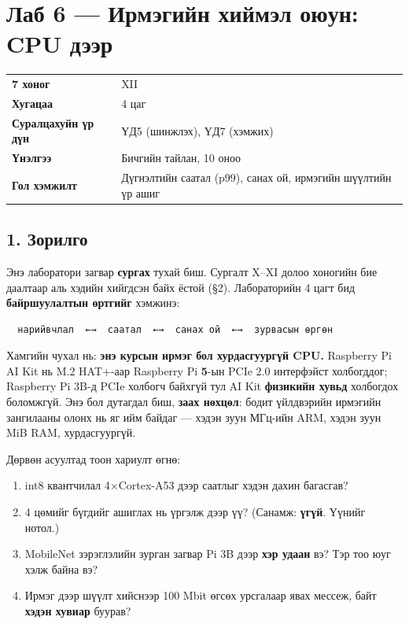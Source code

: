 \chapter{Лаб 6 — Ирмэгийн хиймэл оюун: CPU дээр}

\begingroup\scriptsize\begin{longtable}[]{@{}ll@{}}
\toprule
\endhead
\textbf{7 хоног} & XII\tabularnewline
\textbf{Хугацаа} & 4 цаг\tabularnewline
\textbf{Суралцахуйн үр дүн} & ҮД5 (шинжлэх), ҮД7 (хэмжих)\tabularnewline
\textbf{Үнэлгээ} & Бичгийн тайлан, 10 оноо\tabularnewline
\textbf{Гол хэмжилт} & Дүгнэлтийн саатал (p99), санах ой, ирмэгийн шүүлтийн үр ашиг\tabularnewline
\bottomrule
\end{longtable}\endgroup

\hypertarget{ux437ux43eux440ux438ux43bux433ux43e}{%
\section{1. Зорилго}\label{ux437ux43eux440ux438ux43bux433ux43e}}

Энэ лаборатори загвар \textbf{сургах} тухай биш. Сургалт X--XI долоо хоногийн бие даалтаар аль хэдийн хийгдсэн байх ёстой (§2). Лабораторийн 4 цагт бид \textbf{байршуулалтын өртгийг} хэмжинэ:

\begin{verbatim}
  нарийвчлал  ←→  саатал  ←→  санах ой  ←→  зурвасын өргөн
\end{verbatim}

Хамгийн чухал нь: \textbf{энэ курсын ирмэг бол хурдасгуургүй CPU.} Raspberry Pi AI Kit нь M.2 HAT+-аар Raspberry Pi \textbf{5}-ын PCIe 2.0 интерфэйст холбогддог; Raspberry Pi 3B-д PCIe холбогч байхгүй тул AI Kit \textbf{физикийн хувьд} холбогдох боломжгүй. Энэ бол дутагдал биш, \textbf{заах нөхцөл}: бодит үйлдвэрийн ирмэгийн зангилааны олонх нь яг ийм байдаг --- хэдэн зуун МГц-ийн ARM, хэдэн зуун MiB RAM, хурдасгуургүй.

Дөрвөн асуултад тоон хариулт өгнө:

\begin{enumerate}
\def\labelenumi{\arabic{enumi}.}
\tightlist
\item
  int8 квантчилал 4×Cortex-A53 дээр саатлыг хэдэн дахин багасгав?
\item
  4 цөмийг бүгдийг ашиглах нь үргэлж дээр үү? (Санамж: \textbf{үгүй}. Үүнийг нотол.)
\item
  MobileNet зэрэглэлийн зурган загвар Pi 3B дээр \textbf{хэр удаан} вэ? Тэр тоо юуг хэлж байна вэ?
\item
  Ирмэг дээр шүүлт хийснээр 100 Mbit өгсөх урсгалаар явах мессеж, байт \textbf{хэдэн хувиар} буурав?
\end{enumerate}

